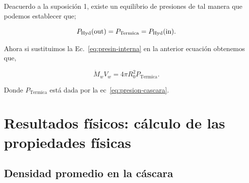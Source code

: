 Deacuerdo a la suposición 1, existe un equilibrio de presiones de tal manera que podemos establecer que;
 
\begin{equation}
  \label{eq:igualda-presion}
  P_{\text{Hyd}}(\mathrm{out}{})=P_{\text{Termica}}=P_{\text{Hyd}}(\mathrm{in}{}).
\end{equation}

Ahora si sustituimos la Ec.~\ref{eq:presin-interna} en la anterior ecuación obtenemos que,

\begin{equation}
  \label{eq:momentum}
   \dot{M}_{w}V_{w} = 4 \pi  R_{0}^{2}  P_{\text{Termica}}. 
\end{equation}

Donde \(P_{\text{Termica}}\) está dada por la ec~\ref{eq:presion-cascara}. 

\section{Resultados físicos: cálculo de las propiedades físicas }
\label{sec:results}

\subsection{Densidad promedio en la cáscara}
\label{sec:density}

